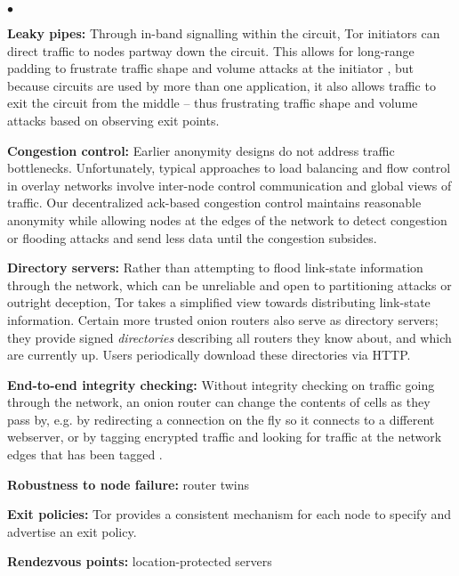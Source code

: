 \documentclass[times,10pt,twocolumn]{article}
\newenvironment{tightlist}{\begin{list}{$\bullet$}{
  \setlength{\itemsep}{0mm}
    \setlength{\parsep}{0mm}
    }}{\end{list}}
\begin{document}
\begin{tightlist}
\item \textbf{Leaky pipes:} Through in-band signalling within the
  circuit, Tor initiators can direct traffic to nodes partway down the
  circuit. This allows for long-range padding to frustrate traffic
  shape and volume attacks at the initiator \cite{defensive-dropping},
  but because circuits are used by more than one application, it also
  allows traffic to exit the circuit from the middle -- thus
  frustrating traffic shape and volume attacks based on observing exit
  points.

\item \textbf{Congestion control:} Earlier anonymity designs do not
address traffic bottlenecks. Unfortunately, typical approaches to load
balancing and flow control in overlay networks involve inter-node control
communication and global views of traffic. Our decentralized ack-based
congestion control maintains reasonable anonymity while allowing nodes
at the edges of the network to detect congestion or flooding attacks
and send less data until the congestion subsides.

\item \textbf{Directory servers:} Rather than attempting to flood
link-state information through the network, which can be unreliable and
open to partitioning attacks or outright deception, Tor takes a simplified
view towards distributing link-state information. Certain more trusted
onion routers also serve as directory servers; they provide signed
\emph{directories} describing all routers they know about, and which
are currently up. Users periodically download these directories via HTTP.

\item \textbf{End-to-end integrity checking:} Without integrity checking
on traffic going through the network, an onion router can change the
contents of cells as they pass by, e.g. by redirecting a connection on
the fly so it connects to a different webserver, or by tagging encrypted
traffic and looking for traffic at the network edges that has been
tagged \cite{minion-design}.

\item \textbf{Robustness to node failure:} router twins

\item \textbf{Exit policies:}
Tor provides a consistent mechanism for each node to specify and
advertise an exit policy.

\item \textbf{Rendezvous points:}
location-protected servers

\end{tightlist}
\end{document}
